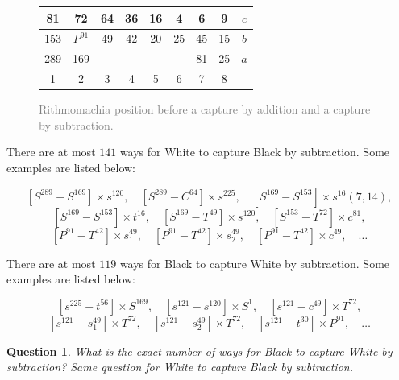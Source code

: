 \documentclass[12pt]{article}
\newtheorem{question}{Question}
\begin{document}
\begin{figure}[h!]
\begin{tabular}{|c|c|c|c|c|c|c|c||c}
\trianglepa{\,}81 & \trianglepa{\,}72 & \circlet{\,}64 & \circlet{\,}36 & \circlet{\,}16 & \circlet{\,}4 & \trianglepa{\,}6 & \trianglepa{\,}9 & $c$ \\ \hline
\squad{\,}153 & \rhombus{\,}$P^{91}$ & \trianglepa{\,}49 & \trianglepa{\,}42 & \trianglepa{\,}20 & \trianglepa{\,}25 & \squad{\,}45 & \squad{\,}15 & $b$ \\ \hline
\squad{\,}289 & \squad{\,}169 & \quad  & \quad  & \quad  & \quad  & \squad{\,}81 & \squad{\,}25 & $a$ \\ \hline
1 &  2 &  3 &  4 &  5 &  6 &  7 &  8  &  \\
\end{tabular} 
\caption{\textcolor{gray}{Rithmomachia position before a capture by addition and a capture by subtraction.}}
\label{fig:rithmomachia-capture-by-addition-subtraction-with-pyramid3} 
\end{figure}


There are at most $141$ ways for White to capture Black by subtraction.
Some examples are listed below:

\[
[S^{289}   -  S^{169}]  \times  s^{120},\quad
[S^{289}   -  C^{64}]  \times  s^{225},\quad
[S^{169}   -  S^{153}]  \times  s^{16} (7, 14),
\]
\[
[S^{169}   -  S^{153}]  \times  t^{16},\quad
[S^{169}   -  T^{49}]  \times  s^{120},\quad
[S^{153}   -  T^{72}]  \times  c^{81},
\]
\[
[P^{91}   -  T^{42}]  \times  s_1^{49},\quad
[P^{91}   -  T^{42}]  \times  s_2^{49},\quad
[P^{91}   -  T^{42}]  \times  c^{49}, \quad \dots 
\]

There are at most $119$ ways for Black to capture White by subtraction.
Some examples are listed below:

\[
[s^{225}   -  t^{56}]  \times  S^{169},\quad
[s^{121}   -  s^{120}]  \times  S^{1} ,\quad
[s^{121}   -  c^{49}] \times  T^{72},
\]
\[
[s^{121}   -  s_1^{49}] \times  T^{72},\quad
[s^{121}   -  s_2^{49}] \times  T^{72},\quad
[s^{121}   -  t^{30}]  \times  P^{91}, \quad \dots
\]


\begin{question}
What is the exact number of ways for Black to capture White by subtraction?
Same question for White to capture Black by subtraction.
\end{question}
\end{document}
